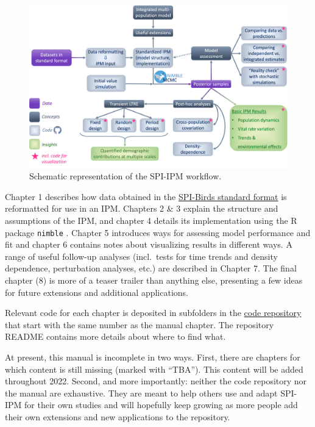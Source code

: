 \documentclass[
]{book}
\begin{document}
\begin{figure}

{\centering \includegraphics[width=1\linewidth]{Figures/SPI-IPM_Workflow} 

}

\caption{Schematic representation of the SPI-IPM workflow.}\label{fig:WorkflowDiag}
\end{figure}

Chapter 1 describes how data obtained in the \href{https://github.com/SPI-Birds/documentation/tree/master/standard_protocol}{SPI-Birds standard format} is reformatted for use in an IPM. Chapters 2 \& 3 explain the structure and assumptions of the IPM, and chapter 4 details its implementation using the R package \texttt{nimble} \citep{devalpine2017}. Chapter 5 introduces ways for assessing model performance and fit and chapter 6 contains notes about visualizing results in different ways. A range of useful follow-up analyses (incl.~tests for time trends and density dependence, perturbation analyses, etc.) are described in Chapter 7. The final chapter (8) is more of a teaser trailer than anything else, presenting a few ideas for future extensions and additional applications.

Relevant code for each chapter is deposited in subfolders in the \href{https://github.com/SPI-Birds/SPI-IPM/tree/main/SPI-IPM_Code}{code repository} that start with the same number as the manual chapter. The repository README contains more details about where to find what.

At present, this manual is incomplete in two ways. First, there are chapters for which content is still missing (marked with ``TBA''). This content will be added throughout 2022. Second, and more importantly: neither the code repository nor the manual are exhaustive. They are meant to help others use and adapt SPI-IPM for their own studies and will hopefully keep growing as more people add their own extensions and new applications to the repository.
\end{document}
